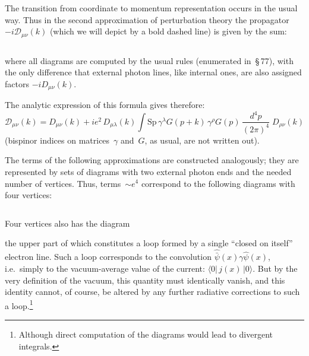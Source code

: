 The transition from coordinate to momentum representation occurs in the usual way. Thus in the second approximation of perturbation theory the propagator $-i\mathcal{D}_{\mu\nu}(k)$ (which we will depict by a bold dashed line) is given by the sum:

\begin{equation}
\label{eq:103.9}
\end{equation}


\noindent where all diagrams are computed by the usual rules (enumerated in~\S\,77), with the only difference that external photon lines, like internal ones, are also assigned factors $-iD_{\mu\nu}(k)$.

The analytic expression of this formula gives therefore:
\begin{equation}
\mathcal{D}_{\mu\nu}(k) = D_{\mu\nu}(k) + ie^2\,D_{\mu\lambda}(k)\int \mathrm{Sp}\,\gamma^\lambda G(p+k)\,\gamma^\rho G(p)\,\frac{d^4p}{(2\pi)^4}\;D_{\rho\nu}(k)
\label{eq:103.10}
\end{equation}
(bispinor indices on matrices~$\gamma$ and~$G$, as usual, are not written out).

The terms of the following approximations are constructed analogously; they are represented by sets of diagrams with two external photon ends and the needed number of vertices. Thus, terms~$\sim e^4$ correspond to the following diagrams with four vertices:

\begin{equation}
\label{eq:103.11}
\end{equation}

Four vertices also has the diagram


\noindent the upper part of which constitutes a loop formed by a single ``closed on itself'' electron line. Such a loop corresponds to the convolution $\hat{\bar{\psi}}(x)\gamma\hat{\psi}(x)$, i.e.\ simply to the vacuum-average value of the current: $\langle 0|\,j(x)\,|0\rangle$. But by the very definition of the vacuum, this quantity must identically vanish, and this identity cannot, of course, be altered by any further radiative corrections to such a loop.\footnote{Although direct computation of the diagrams would lead to divergent integrals.}

